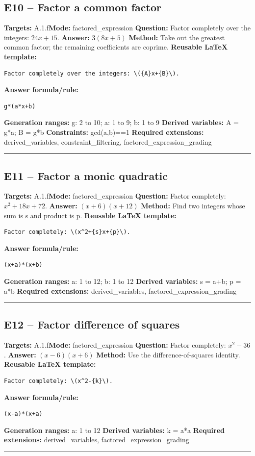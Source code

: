 \documentclass[11pt]{article}
\begin{document}
\subsection{E10 -- Factor a common factor}
\textbf{Targets:} A.1.f\quad\textbf{Mode:} factored\_expression
\textbf{Question:} Factor completely over the integers: \(24x+15\).
\textbf{Answer:} \(3(8x+5)\)
\textbf{Method:} Take out the greatest common factor; the remaining coefficients are coprime.
\textbf{Reusable LaTeX template:}
\begin{verbatim}
Factor completely over the integers: \({A}x+{B}\).
\end{verbatim}
\textbf{Answer formula/rule:}
\begin{verbatim}
g*(a*x+b)
\end{verbatim}
\textbf{Generation ranges:} g: 2 to 10; a: 1 to 9; b: 1 to 9
\textbf{Derived variables:} A = g*a; B = g*b
\textbf{Constraints:} gcd(a,b)==1
\textbf{Required extensions:} derived\_variables, constraint\_filtering, factored\_expression\_grading
\medskip\hrule\medskip
\subsection{E11 -- Factor a monic quadratic}
\textbf{Targets:} A.1.f\quad\textbf{Mode:} factored\_expression
\textbf{Question:} Factor completely: \(x^2+18x+72\).
\textbf{Answer:} \((x+6)(x+12)\)
\textbf{Method:} Find two integers whose sum is s and product is p.
\textbf{Reusable LaTeX template:}
\begin{verbatim}
Factor completely: \(x^2+{s}x+{p}\).
\end{verbatim}
\textbf{Answer formula/rule:}
\begin{verbatim}
(x+a)*(x+b)
\end{verbatim}
\textbf{Generation ranges:} a: 1 to 12; b: 1 to 12
\textbf{Derived variables:} s = a+b; p = a*b
\textbf{Required extensions:} derived\_variables, factored\_expression\_grading
\medskip\hrule\medskip
\subsection{E12 -- Factor difference of squares}
\textbf{Targets:} A.1.f\quad\textbf{Mode:} factored\_expression
\textbf{Question:} Factor completely: \(x^2-36\).
\textbf{Answer:} \((x-6)(x+6)\)
\textbf{Method:} Use the difference-of-squares identity.
\textbf{Reusable LaTeX template:}
\begin{verbatim}
Factor completely: \(x^2-{k}\).
\end{verbatim}
\textbf{Answer formula/rule:}
\begin{verbatim}
(x-a)*(x+a)
\end{verbatim}
\textbf{Generation ranges:} a: 1 to 12
\textbf{Derived variables:} k = a*a
\textbf{Required extensions:} derived\_variables, factored\_expression\_grading
\medskip\hrule\medskip
\end{document}
